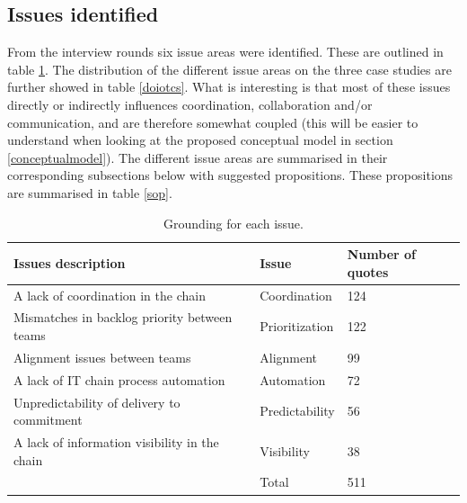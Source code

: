 \subsection{Issues identified}

From the interview rounds six issue areas were identified. These are outlined in table \ref{gfei}. The distribution of the different issue areas on the three case studies are further showed in table \ref{doiotcs}. What is interesting is that most of these issues directly or indirectly influences coordination, collaboration and/or communication, and are therefore somewhat coupled (this will be easier to understand when looking at the proposed conceptual model in section \ref{conceptualmodel}). The different issue areas are summarised in their corresponding subsections below with suggested propositions. These propositions are summarised in table \ref{sop}.

\begin{table}[ht!]
\begin{center}
    \begin{tabular}{| p{6.5cm} | p{3.75cm} | p{3.75cm} |}
    \hline
    \textbf{Issues description} & \textbf{Issue} & \textbf{Number of quotes} \\ \hline
    A lack of coordination in the chain & Coordination & 124 \\ \hline
    Mismatches in backlog priority between teams & Prioritization & 122 \\ \hline
    Alignment issues between teams & Alignment & 99 \\ \hline
    A lack of IT chain process automation & Automation & 72 \\ \hline
    Unpredictability of delivery to commitment & Predictability & 56 \\ \hline
    A lack of information visibility in the chain & Visibility & 38 \\ \hline
     & Total & 511 \\ \hline
    \end{tabular}
    \caption{Grounding for each issue.}
    \label{gfei}
\end{center}
\end{table}

